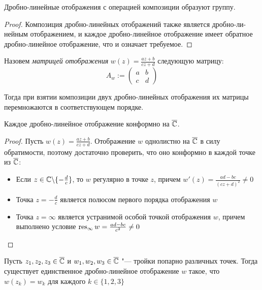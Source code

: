 \begin{corollary}
	Дробно-линейные отображения с операцией композиции образуют группу.
\end{corollary}

\begin{proof}
	Композиция дробно-линейных отображений также является дробно-ли-нейным отображением, и каждое дробно-линейное отображение имеет обратное дробно-линейное отображение, что и означает требуемое.
\end{proof}

\begin{note}
	Назовем \textit{матрицей отображения} $w(z) = \frac{az + b}{cz + d}$ следующую матрицу:
	\[A_w := \begin{pmatrix} a&b\\c&d\end{pmatrix}\]
	
	Тогда при взятии композиции двух дробно-линейных отображения их матрицы перемножаются в соответствующем порядке.
\end{note}

\begin{proposition}
	Каждое дробно-линейное отображение конформно на $\overline{\mathbb{C}}$.
\end{proposition}

\begin{proof}
	Пусть $w(z) = \frac{az + b}{cz + d}$. Отображение $w$ однолистно на $\overline{\mathbb{C}}$ в силу обратимости, поэтому достаточно проверить, что оно конформно в каждой точке из $\overline{\mathbb{C}}$:
	\begin{itemize}
		\item Если $z \in \mathbb{C} \backslash \{-\frac dc\}$, то $w$ регулярно в точке $z$, причем $w'(z) = \frac{ad - bc}{(cz + d)^2} \ne 0$
		
		\item Точка $z = -\frac dc$ является полюсом первого порядка отображения $w$
		
		\item Точка $z = \infty$ является устранимой особой точкой отображения $w$, причем выполнено условие $\operatorname*{res}_\infty w = \frac{ad - bc}{c^2} \ne 0$\qedhere
	\end{itemize}
\end{proof}

\begin{proposition}
	Пусть $z_1, z_2, z_3 \in \overline{\mathbb{C}}$ и $w_1, w_2, w_3 \in \overline{\mathbb{C}}$  "--- тройки попарно различных точек. Тогда существует единственное дробно-линейное отображение $w$ такое, что $w(z_k) = w_k$ для каждого $k \in \{1, 2, 3\}$
\end{proposition}

